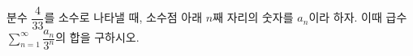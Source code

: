 분수 $\dfrac{4}{33}$를 소수로 나타낼 때, 소수점 아래 $n$째 자리의 숫자를 $a_n$이라 하자. 이때 급수 $\displaystyle\sum_{n=1}^{\infty}\dfrac{a_n}{3^n}$의 합을 구하시오.
